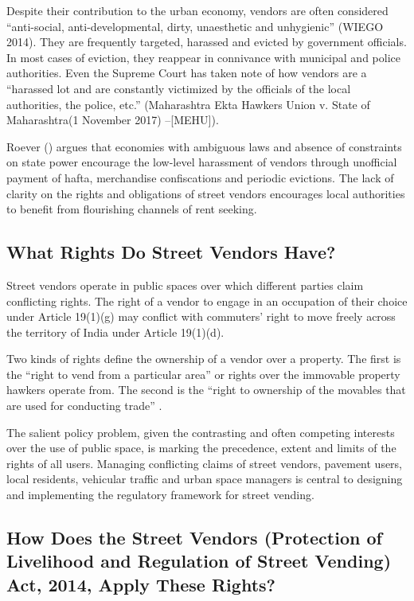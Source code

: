 \documentclass[a4paper, 12pt, twoside]{article}
\begin{document}
{Despite their contribution to the urban economy, vendors are often considered “anti-social, anti-developmental, dirty, unaesthetic and unhygienic” (WIEGO 2014). They are frequently targeted, harassed and evicted by government officials. In most cases of eviction, they reappear in connivance with municipal and police authorities. Even the Supreme Court has taken note of how vendors are a “harassed lot and are constantly victimized by the officials of the local authorities, the police, etc.” (Maharashtra Ekta Hawkers Union v. State of Maharashtra(1 November 2017) –[MEHU]).

Roever (\cite*{sallypaper}) argues that economies with ambiguous laws and absence of constraints on state power encourage the low-level harassment of vendors through unofficial payment of hafta, merchandise confiscations and periodic evictions. The lack of clarity on the rights and obligations of street vendors encourages local authorities to benefit from flourishing channels of rent seeking.

\subsection*{What Rights Do Street Vendors Have?}
Street vendors operate in public spaces over which different parties claim conflicting rights. The right of a  vendor to engage in an occupation of their choice under Article 19(1)(g) may conflict with commuters’ right to move freely across the territory of India under Article 19(1)(d).

Two kinds of rights define the ownership of a vendor over a property. The first is the “right to vend from a particular area” or rights over the immovable property hawkers operate from. The second is the “right to ownership of the movables that are used for conducting trade” \parencite{ccspaper}.

The salient policy problem, given the contrasting and often competing interests over the use of public space, is marking the precedence, extent and limits of the rights of all users. Managing conflicting claims of street vendors, pavement users, local residents, vehicular traffic and urban space managers is central to designing and implementing the regulatory framework for street vending.

\subsection*{How Does the Street Vendors (Protection of Livelihood and Regulation of Street Vending) Act, 2014, Apply These Rights?}

}
\end{document}

